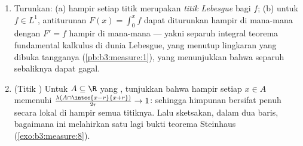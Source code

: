 \begin{problem}
\begin{enumerate}[resume]
\[        \qquad (r \to 0)\quad\text{untuk hampir setiap }x .
        \]
        \emph{(Jelas untuk $f$ yang . Secara umum tulislah $f
        = g + h$, dengan $g$  berpendukung  dan
        $\norm h_1 < \varepsilon$
        (\cref{thm:b3:lp:density}); maka himpunan yang
        $\limsup_{r\to0}$ osilasi rata-ratanya melampaui
        $\delta$ terletak di dalam $\{Mh > \delta/2\} \cup \{\abs h
        > \delta/2\}$, yang berukuran $O(\varepsilon/\delta)$;
        lalu biarkan $\varepsilon \to 0$, lalu $\delta \to 0$ sepanjang sebuah
        barisan.)}
  \item Turunkan: (a) hampir setiap titik merupakan \emph{titik
        Lebesgue} bagi $f$; (b) untuk $f \in L^1$, antiturunan
        $F(x) = \int_0^xf$ dapat diturunkan hampir di mana-mana dengan $F' =
        f$ hampir di mana-mana --- yakni separuh integral teorema
        fundamental kalkulus di dunia Lebesgue, yang menutup
        lingkaran yang dibuka tangganya
        (\cref{pb:b3:measure:1}), yang menunjukkan bahwa separuh
        sebaliknya dapat gagal.
  \item (Titik ) Untuk $A \subseteq \R$ yang ,
        tunjukkan bahwa hampir setiap $x \in A$ memenuhi
        $\frac{\lambda(A\cap\intcc{x-r}{x+r})}{2r} \to 1$:
        sehingga himpunan  bersifat penuh secara lokal di hampir semua
        titiknya. Lalu sketsakan, dalam dua baris, bagaimana ini melahirkan
        satu lagi bukti teorema Steinhaus
        (\cref{exo:b3:measure:8}).
\end{enumerate}


\end{problem}
